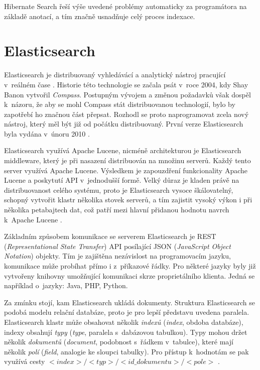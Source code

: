 \documentclass[11pt,oneside]{fithesis2}
\begin{document}
Hibernate Search řeší výše uvedené problémy automaticky za programátora na základě anotací, a tím značně usnadňuje celý proces indexace.

\newpage

\section{Elasticsearch}
\label{ElasticsearchChapter}
Elasticsearch je distribuovaný vyhledávácí a analytický nástroj pracující v~reálném čase \cite{ElasticsearchDefinitiveGuide}. Historie této technologie se začala psát v~roce 2004, kdy Shay Banon vytvořil \emph{Compass}. Postupným vývojem a změnou požadavků však dospěl k~názoru, že aby se mohl Compass stát distribuovanou technologií, bylo by zapotřebí ho značnou část přepsat. Rozhodl se proto naprogramovat zcela nový nástroj, který měl být již od počátku distribuovaný. První verze Elasticsearch byla vydána v~únoru 2010 \cite{ElasticsearchWiki}.

Elasticsearch využívá Apache Lucene, nicméně architekturou je Elasticsearch middleware, který je při nasazení distribuován na množinu serverů. Každý tento server využívá Apache Lucene. Výsledkem je zapouzdření funkcionality Apache Lucene a poskytutí API v~jednodušší formě. Velký důraz je kladen právě na distribuovanost celého systému, proto je Elasticsearch vysoce škálovatelný, schopný vytvořit klastr několika stovek serverů, a tím zajistit vysoký výkon i při několika petabajtech dat, což patří mezi hlavní přidanou hodnotu navrch k~Apache Lucene \cite{ElasticsearchDefinitiveGuide}.

Základním způsobem komunikace se serverem Elasticsearch je REST (\emph{Representational State Transfer}) API posílající JSON (\emph{JavaScript Object Notation}) objekty. Tím je zajištěna nezávislost na programovacím jazyku, komunikace může probíhat přímo i z~příkazové řádky. Pro některé jazyky byly již vytvořeny knihovny umožňující komunikaci skrze proprietálního klienta. Jedná se například o~jazyky: Java, PHP, Python. 

Za zmínku stojí, kam Elasticsearch ukládá dokumenty. Struktura Elasticsearch se podobá modelu relační databáze, proto je pro lepší představu uvedena paralela. Elasticsearch klastr může obsahovat několik \emph{indexů} (\emph{index}, obdoba databáze), indexy obsahují \emph{typy} (\emph{type}, paralela s~dabázovou tabulkou). Typy mohou držet několik \emph{dokumentů} (\emph{document}, podobnost s~řádkem v~tabulce), které mají několik \emph{polí} (\emph{field}, analogie ke sloupci tabulky). Pro přístup k~hodnotám se pak využívá cesty $<index>/<typ>/<id\_dokumentu>/<pole>$ \cite{ElasticsearchDefinitiveGuide}.
\end{document}
